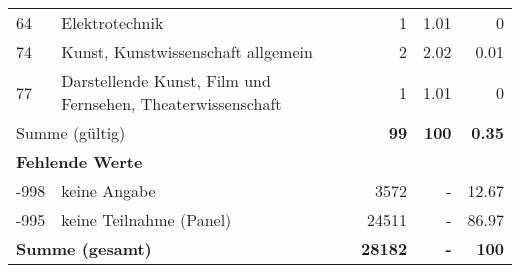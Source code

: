 \begin{longtable}{lXrrr}
        64 & \multicolumn{1}{X}{Elektrotechnik} & %
          \num{1} &
          \num[round-mode=places,round-precision=2]{1.01} &
          \num[round-mode=places,round-precision=2]{0} \\

        74 & \multicolumn{1}{X}{Kunst, Kunstwissenschaft allgemein} & %
          \num{2} &
          \num[round-mode=places,round-precision=2]{2.02} &
          \num[round-mode=places,round-precision=2]{0.01} \\

        77 & \multicolumn{1}{X}{Darstellende Kunst, Film und Fernsehen, Theaterwissenschaft} & %
          \num{1} &
          \num[round-mode=places,round-precision=2]{1.01} &
          \num[round-mode=places,round-precision=2]{0} \\

     \midrule
     \multicolumn{2}{l}{Summe (gültig)} &
       \textbf{\num{99}} &
     \textbf{\num{100}} &
       \textbf{\num[round-mode=places,round-precision=2]{0.35}} \\
     \multicolumn{5}{l}{\textbf{Fehlende Werte}}\\
       -998 &
       keine Angabe &
         \num{3572} &
        - &
         \num[round-mode=places,round-precision=2]{12.67} \\
       -995 &
       keine Teilnahme (Panel) &
         \num{24511} &
        - &
         \num[round-mode=places,round-precision=2]{86.97} \\
     \midrule
     \multicolumn{2}{l}{\textbf{Summe (gesamt)}} &
          \textbf{\num{28182}} &
        \textbf{-} &
        \textbf{\num{100}} \\
     \bottomrule
     \end{longtable}
     
